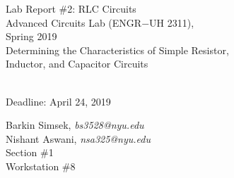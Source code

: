 \documentclass[journal]{IEEEtran}
\begin{document}
\begin{titlepage}
    {\centering
        \vspace*{20em}
        {
        \huge 
        \begin{spacing}{1.5}
            Lab Report \#2: RLC Circuits
            \\
            Advanced Circuits Lab (ENGR$-$UH 2311),\\
            Spring 2019
            \bigskip
            \Large
            \\
            Determining the Characteristics of Simple Resistor,\\
            Inductor, and Capacitor Circuits
  
            \\
            \bigskip
            Deadline: April 24, 2019 
        \end{spacing}

        }
        
    }
    \vfill
    
    {
    \large
    
    \begin{spacing}{1.5}
    \noindent Barkin Simsek, {\it {bs3528@nyu.edu}} 
    \\
    Nishant Aswani, {\it {nsa325@nyu.edu}}
    \\
    Section \#1%
    \\
    Workstation \#8%
    \end{spacing}
    }


\end{titlepage}
{}
\setcounter{page}{1}




%
{}

\end{document}
